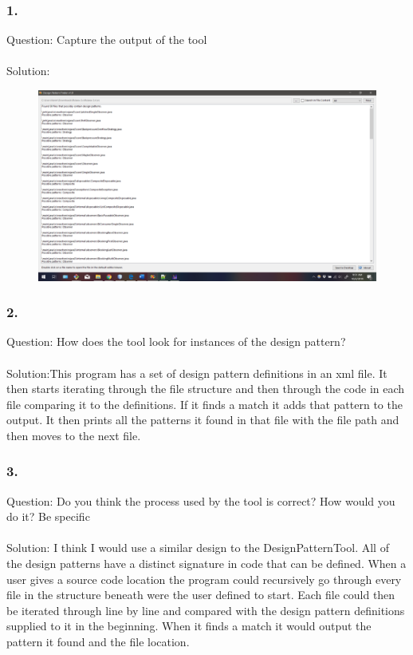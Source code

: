 \documentclass{article}
\begin{document}
\subsubsection*{1.}
Question: Capture the output of the tool\\\\
Solution: 
\begin{figure}[h]
	\centering
	\includegraphics[width=6in]{hw4-patterns.png}
\end{figure}
\subsubsection*{2.}
Question: How does the tool look for instances of the design pattern?\\\\

Solution:This program has a set of design pattern definitions in an xml file. It then starts iterating through the file structure and then through the code in each file comparing it to the definitions. If it finds a match it adds that pattern to the output. It then prints all the patterns it found in that file with the file path and then moves to the next file. 
\subsubsection*{3.}
Question: Do you think the process used by the tool is correct?  How would you do it? Be specific\\\\
Solution: I think I would use a similar design to the DesignPatternTool. All of the design patterns have a distinct signature in code that can be defined. When a user gives a source code location the program could recursively go through every file in the structure beneath were the user defined to start. Each file could then be iterated through line by line and compared with the design pattern definitions supplied to it in the beginning. When it finds a match it would output the pattern it found and the file location. 
\end{document}
